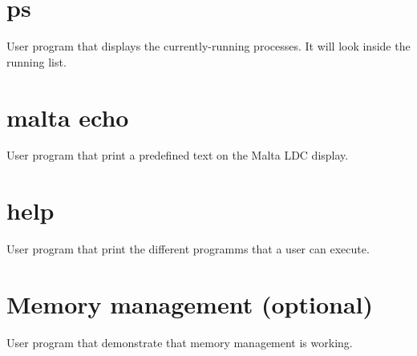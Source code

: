 \section{ps}
User program that displays the currently-running processes.
It will look inside the running list.

\section{malta echo}

User program that print a predefined text on the Malta LDC display.

\section{help}
User program that print the different programms that a user can execute.

\section{Memory management (optional)}

User program that demonstrate that memory management is working.


